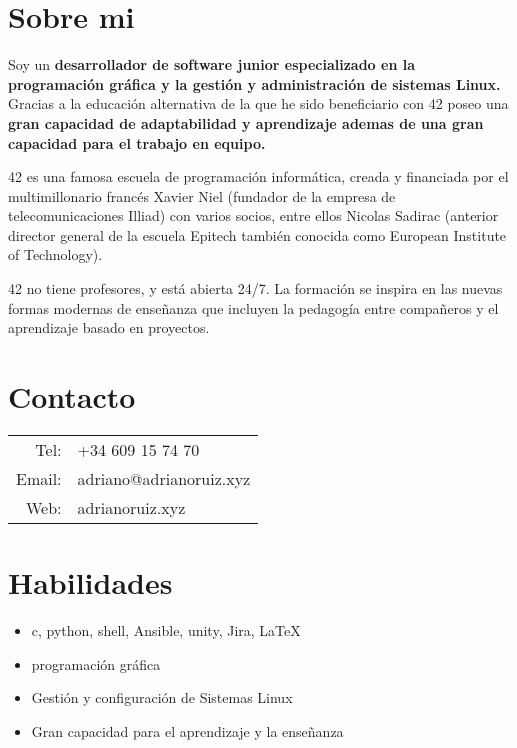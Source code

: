 \documentclass[11pt, oneside, a4paper, titlepage]{article}
\begin{document}
	 \begin{tcolorbox}
		\begin{minipage}[t]{8cm} \vspace*{-0.5cm} \begin{tcolorbox}[grow to
			left by=0.6cm,colback=gray!25,colframe=white] \section*{Sobre mi}
			Soy un \textbf{desarrollador de software junior especializado en la
			programación gráfica y la gestión y administración de sistemas
			Linux.} Gracias a la educación alternativa de la que he sido
			beneficiario con 42 poseo una \textbf{gran capacidad de
			adaptabilidad y aprendizaje ademas de una
			gran capacidad para el trabajo en equipo.}

			42 es una famosa escuela de programación informática, creada y
			ﬁnanciada por el multimillonario francés Xavier Niel (fundador de
			la empresa de telecomunicaciones Illiad) con varios socios, entre
			ellos Nicolas Sadirac (anterior director general de la escuela
			Epitech también conocida como European Institute of Technology).
			
			
			42 no tiene profesores, y está abierta 24/7. La formación se
			inspira en las nuevas formas modernas de enseñanza que incluyen la
			pedagogía entre compañeros y el aprendizaje basado en proyectos.

			\section*{Contacto} \begin{tabular}{r l} Tel: & +34 609 15 74 70 \\
			Email: & adriano@adrianoruiz.xyz \\ Web: & adrianoruiz.xyz \\
			\end{tabular}

		\section*{Habilidades} 
			\begin{itemize} 
				\item{c, python, shell, Ansible, unity, Jira, \LaTeX} 
				\item{programación gráfica} 
				\item{Gestión y configuración de Sistemas Linux} 
				\item{Gran capacidad para el aprendizaje y la enseñanza} 
			\end{itemize} 

\end{tcolorbox}
\end{minipage}
\end{tcolorbox}
\end{document}
